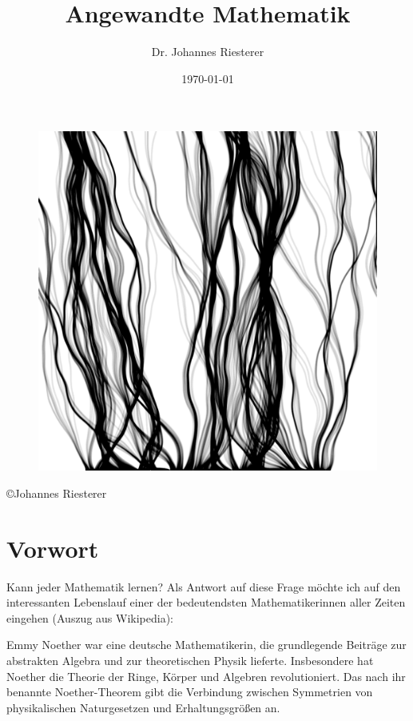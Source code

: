 \title{ Angewandte Mathematik}
\author{Dr. Johannes Riesterer}
\date{\today}
\maketitle\thispagestyle{empty}
 \begin{figure}[H]
    \centering
    \includegraphics[width=1.0 \textwidth]{images/cover.png}
    \label{fig:diffus}
\end{figure}
\newpage 
\begin{center}
\large
 \copyright Johannes Riesterer \\
\end{center}
\thispagestyle{empty}
\newpage

\section*{Vorwort}
\mbox{}\thispagestyle{empty}
Kann jeder Mathematik lernen? Als Antwort auf diese Frage möchte ich auf den interessanten Lebenslauf
einer der bedeutendsten Mathematikerinnen aller Zeiten eingehen  (Auszug aus Wikipedia):

Emmy Noether war eine deutsche Mathematikerin, die grundlegende Beiträge zur abstrakten Algebra und zur theoretischen Physik lieferte. Insbesondere hat Noether die Theorie der Ringe, Körper und Algebren revolutioniert. Das nach ihr benannte Noether-Theorem gibt die Verbindung zwischen Symmetrien von physikalischen Naturgesetzen und Erhaltungsgrößen an. 

